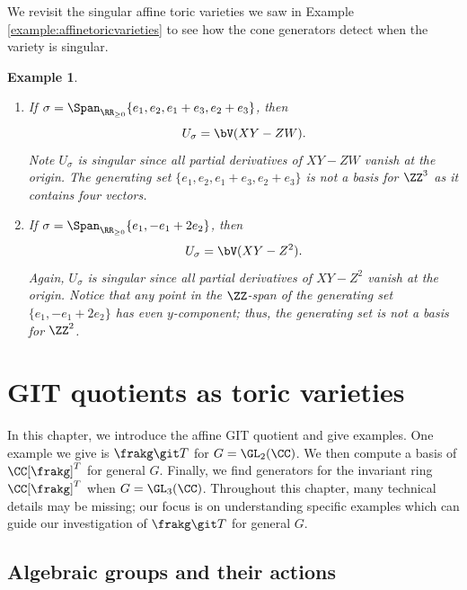 \documentclass[12pt]{amsart}
\theoremstyle{plain}
\newtheorem{example}[theorem]{Example}
\begin{document}
We revisit the singular affine toric varieties we saw in Example \ref{example:affinetoricvarieties} to see how the cone generators detect when the variety is singular.

\begin{example}
\begin{enumerate}
\item If $\sigma = \Span_{\RR_{\ge 0}}\{e_1, e_2, e_1+e_3, e_2+e_3\}$, then
$$U_\sigma = \bV(XY - ZW).$$
Note $U_\sigma$ is singular since all partial derivatives of $XY-ZW$ vanish at the origin.
The generating set $\{e_1, e_2, e_1+e_3, e_2+e_3\}$ is not a basis for $\ZZ^3$ as it contains four vectors.
\item If $\sigma = \Span_{\RR_{\ge 0}}\{e_1, -e_1+2e_2\}$, then
$$U_\sigma = \bV(XY - Z^2).$$
Again, $U_\sigma$ is singular since all partial derivatives of $XY-Z^2$ vanish at the origin.
Notice that any point in the $\ZZ$-span of the generating set $\{e_1, -e_1+2e_2\}$ has even $y$-component; thus, the generating set is not a basis for $\ZZ^2$.
\end{enumerate}
\end{example}








\newpage
\section{GIT quotients as toric varieties}
In this chapter, we introduce the affine GIT quotient and give examples.
One example we give is $\frakg \git T$ for $G = \GL_2(\CC)$.
We then compute a basis of $\CC[\frakg]^T$ for general $G$.
Finally, we find generators for the invariant ring $\CC[\frakg]^T$ when $G = \GL_3(\CC)$.
Throughout this chapter, many technical details may be missing;
our focus is on understanding specific examples which can guide our investigation of $\frakg \git T$ for general $G$.





\subsection{Algebraic groups and their actions}
\end{document}
